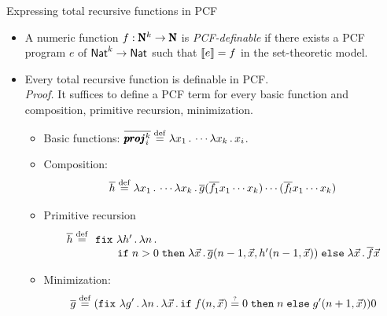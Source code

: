 \documentclass[paper=screen,mode=present,style=zysimple]{powerdot}
\begin{document}
\begin{slide}{Expressing total recursive functions in PCF}
\begin{itemize}
\item A numeric function $f: \pmb{\mathrm{N}}^k \to \pmb{\mathrm{N}}$ is {\em PCF-definable} 
  if there exists a PCF program $e$ of $\mathsf{Nat}^k \to \mathsf{Nat}$ such that 
  ${\left\llbracket{e}\right\rrbracket} = f$ in the set-theoretic model.
\item Every total recursive function is definable in PCF. \\
{\em Proof.} It suffices to define a PCF term for every basic function and composition, primitive recursion, 
minimization.
\vspace*{-0.5em}
\begin{itemize}
\item Basic functions: $\overline{\pmb{proj}_i^k} \stackrel{\mathrm{def}}{=} \lambda x_1 \, . \, \cdots \lambda x_k \, . \, x_i$.
\item Composition: 
\vspace*{-0.5em}
\[
\overline{h} \defeq \lambda x_1 \ldot \cdots \lambda x_k \ldot 
\overline{g} (\overline{f_1} x_1 \cdots x_k) \cdots (\overline{f_l} x_1 \cdots x_k) 
\vspace*{-2.5em}
\]
\item Primitive recursion
\vspace*{-0.5em}
\[
\begin{array}{ll}
\overline{h} \defeq \! \! & \cfix \, \lambda h' \ldot \lambda n \ldot 
\\ &
\qquad\cif{n > 0}
{\lambda \vec{x} \ldot \overline{g} (n-1, \vec{x}, h' (n-1, \vec{x}))}
{\lambda \vec{x} \ldot \overline{f} \vec{x}}
\end{array}
\vspace*{-1.5em}
\]
\item Minimization: 
\vspace*{-0.5em}
\[
\overline{g} \defeq (\cfix \, \lambda g' \ldot \lambda n \ldot \lambda \vec{x} \ldot  
\cif{f (n, \vec x) \eqtest 0}{n}{g' (n+1, \vec x)}) 0
\vspace*{-0.5em}
\]
\end{itemize}
\end{itemize}
\end{slide}
\end{document}
